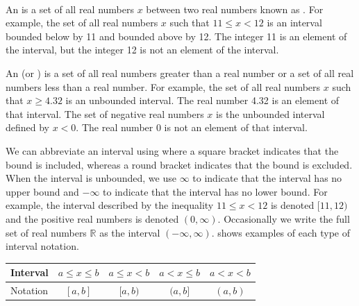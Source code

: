 \begin{defn}[Intervals]
\label{defn_intervals} 
~
    \begin{apart}
        \item An  is a set of all real numbers $x$ between two real numbers known as . For example, the set of all real numbers $x$ such that $11 \le x < 12$ is an interval bounded below by 11 and bounded above by 12. The integer 11 is an element of the interval, but the integer 12 is not an element of the interval.
        \item An  (or ) is a set of all real numbers greater than a real number or a set of all real numbers less than a real number.  For example, the set of all real numbers $x$ such that $x\ge 4.32$ is an unbounded interval. The real number 4.32 is an element of that interval. The set of negative real numbers $x$ is the unbounded interval defined by  $x<0$.  The real number 0 is not an element of that interval.
        \item We can abbreviate an interval using  where a square bracket indicates that the bound is included, whereas a round bracket indicates that the bound is excluded.  When the interval is unbounded, we use $\infty$ to indicate that the interval has no upper bound and $-\infty$ to indicate that the interval has no lower bound.  For example, the interval described by the inequality $11 \le x < 12$ is denoted $[11,12)$ and the positive real numbers is denoted $(0,\infty)$.
        Occasionally we write the full set of real numbers $\mathbb{R}$ as the interval $(-\infty,\infty).$   shows examples of each type of interval notation.

        \begin{table}[ht]
            \centering
            \begin{tabular}{l | c|c|c|c}
                Interval 
                & $a \le x \le b$ 
                & $a \le x < b$
                & $a < x \le b$
                & $a < x < b$           \\ \hline
                Notation 
                & $[a,b]$ 
                & $[a,b)$
                & $(a,b]$
                & $(a,b)$
            \end{tabular}
            
            \vspace{.15in}
            

\end{table}
\end{apart}
\end{defn}
